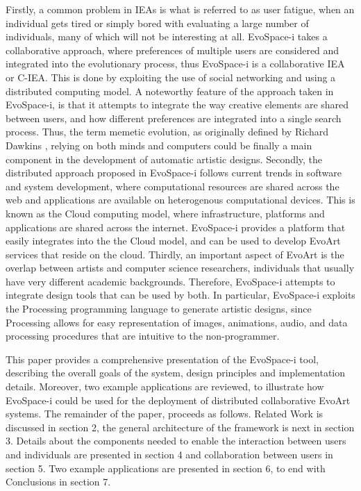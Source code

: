 \documentclass{sig-alternate}
\begin{document}
Firstly, a common problem in IEAs is what is referred to as user fatigue, when an individual gets tired or simply bored with evaluating a large number of individuals,
many of which will not be interesting at all.
EvoSpace-i takes a collaborative approach, where preferences of multiple users are considered and integrated into the evolutionary process,
thus EvoSpace-i is a collaborative IEA or C-IEA.
This is done by exploiting the use of social networking and using a distributed computing model.
A noteworthy feature of the approach taken in EvoSpace-i, is that it attempts to integrate the way creative elements are shared between users,
and how different preferences are integrated into a single search process.
Thus, the term memetic evolution, as originally defined by Richard Dawkins \cite{r.dawkins1976the-selfish-gen}, relying on both minds and computers
could be finally a main component in the development of automatic artistic designs.
Secondly, the distributed approach proposed in EvoSpace-i follows current trends in software and system development,
where computational resources are shared across the web and applications are available on heterogenous computational devices.
This is known as the Cloud computing model, where infrastructure, platforms and applications are shared across the internet.
EvoSpace-i provides a platform that easily integrates into the the Cloud model, and can be used to develop EvoArt services that reside on the cloud.
Thirdly, an important aspect of EvoArt is the overlap between artists and computer science researchers, individuals that usually have very different
academic backgrounds. Therefore, EvoSpace-i attempts to integrate design tools that can be used by both.
In particular, EvoSpace-i exploits the Processing programming language to generate artistic designs,
since Processing allows for easy representation of images, animations, audio, and data processing procedures that are intuitive to the non-programmer.


This paper provides a comprehensive presentation of the EvoSpace-i tool, describing the overall goals of the system,
design principles and implementation details.
Moreover, two example applications are reviewed, to illustrate how EvoSpace-i could be used for the deployment of distributed collaborative EvoArt systems.
The remainder of the paper, proceeds as follows. Related Work is discussed in section 2, the general architecture of the framework is next in section 3. Details
about the components needed to enable the interaction between users and individuals are presented in section 4 and collaboration between users in section 5. Two example applications are presented in section 6, to end with Conclusions in section 7.
 
\end{document}
